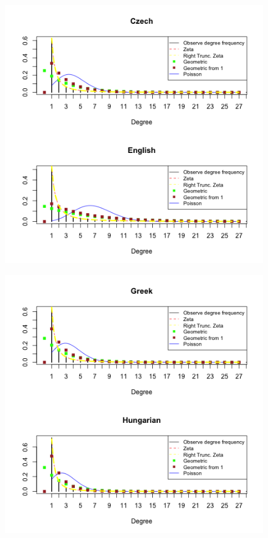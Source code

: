 \documentclass[paper=a4, fontsize=11pt]{scrartcl} %
\theoremstyle{plain}
\begin{document}
\begin{figure}[htbp] %
   \centering
   \includegraphics[width=\textwidth]{General_3} %
\end{figure}

\begin{figure}[htbp] %
   \centering
   \includegraphics[width=\textwidth]{General_4} %
\end{figure}
\end{document}
